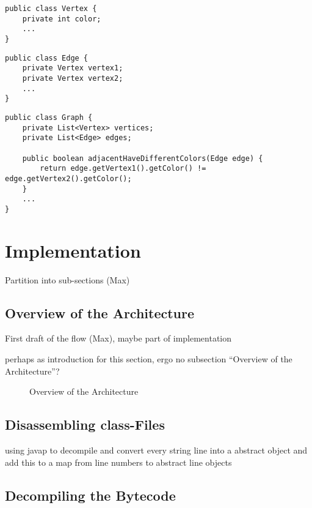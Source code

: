 \documentclass[conference]{IEEEtran}
\begin{document}
\begin{lstlisting}[caption=Example -- Vertex]
public class Vertex {
	private int color;
	...
}
\end{lstlisting}

\begin{lstlisting}[caption=Example -- Edge]
public class Edge {
    private Vertex vertex1;
    private Vertex vertex2;
    ...
}
\end{lstlisting}

\begin{lstlisting}[caption=Example -- Graph]
public class Graph {
    private List<Vertex> vertices;
    private List<Edge> edges;

    public boolean adjacentHaveDifferentColors(Edge edge) {
        return edge.getVertex1().getColor() != edge.getVertex2().getColor();
    }
    ...
}
\end{lstlisting}

\section{Implementation}
\label{sec:implementation}

\danger Partition into sub-sections (Max)

\subsection{Overview of the Architecture}
\label{sec:impl_overv-arch}

\danger First draft of the flow (Max), maybe part of implementation

\danger perhaps as introduction for this section, ergo no subsection ``Overview
of the Architecture''?

\begin{figure*}
  \centering
  \label{fig:architecture}
  \tikzarchitecture
  \caption{Overview of the Architecture}
\end{figure*}

\subsection{Disassembling class-Files}
\label{sec:impl_disassembling}

\danger using javap to decompile and convert every string line into a abstract
object and add this to a map from line numbers to abstract line objects

\subsection{Decompiling the Bytecode}
\label{sec:impl_decompiling}
\end{document}
